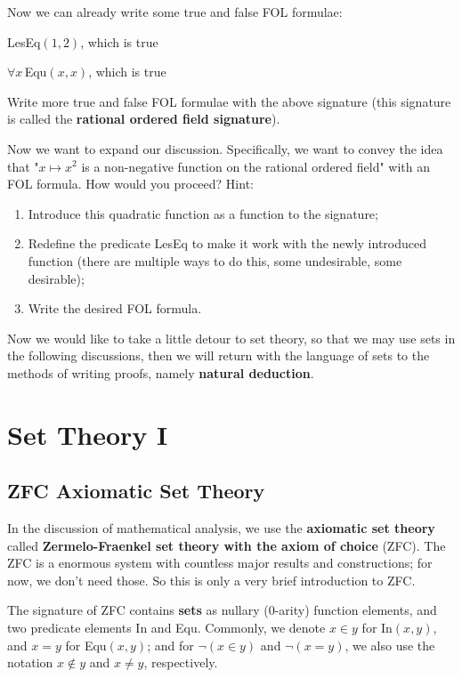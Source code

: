 \documentclass[../main.tex]{subfiles}
\begin{document}
Now we can already write some true and false FOL formulae:
\begin{example}
LesEq$(1,2)$, which is true
\end{example}
\begin{example}
$\forall x\,$Equ$(x,x)$, which is true
\end{example}
\begin{exercise}
Write more true and false FOL formulae with the above signature (this signature is called the \textbf{rational ordered field signature}).
\end{exercise}

\begin{exercise}
Now we want to expand our discussion. Specifically, we want to convey the idea that "$x\mapsto x^2$ is a non-negative function on the rational ordered field" with an FOL formula. How would you proceed? Hint:
\begin{enumerate}
    \item Introduce this quadratic function as a function to the signature;
    \item Redefine the predicate LesEq to make it work with the newly introduced function (there are multiple ways to do this, some undesirable, some desirable);
    \item Write the desired FOL formula.
\end{enumerate}
\end{exercise}

Now we would like to take a little detour to set theory, so that we may use sets in the following discussions, then we will return with the language of sets to the methods of writing proofs, namely \textbf{natural deduction}.

\section{Set Theory I}
\subsection{ZFC Axiomatic Set Theory}
In the discussion of mathematical analysis, we use the \textbf{axiomatic set theory} called \textbf{Zermelo-Fraenkel set theory with the axiom of choice} (ZFC). The ZFC is a enormous system with countless major results and constructions; for now, we don't need those. So this is only a very brief introduction to ZFC.

The signature of ZFC contains \textbf{sets} as nullary ($0$-arity) function elements, and two predicate elements In and Equ. Commonly, we denote $x\in y$ for In$(x,y)$, and $x=y$ for Equ$(x,y)$; and for $\neg(x\in y)$ and $\neg(x=y)$, we also use the notation $x\notin y$ and $x\neq y$, respectively.
\end{document}
